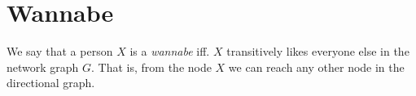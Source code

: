 %
%

\section{Wannabe}
We say that a person $X$ is a {\it wannabe} iff. $X$ transitively likes
everyone else in the network graph $G$. That is, from the node $X$ we can
reach any other node in the directional graph.


